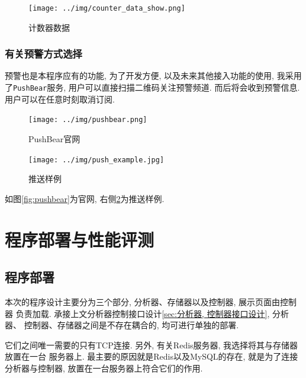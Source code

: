 \begin{figure}[htbp!]
  \centering
  \texttt{[image: ../img/counter\_data\_show.png]}
  \caption{计数器数据}
  \label{fig:counter_data_show}
\end{figure}

\subsection{有关预警方式选择}

  预警也是本程序应有的功能, 为了开发方便, 以及未来其他接入功能的使用,
我采用了\texttt{PushBear}服务, 用户可以直接扫描二维码关注预警频道.
而后将会收到预警信息. 用户可以在任意时刻取消订阅.

\begin{figure}[htbp]

\centering
\begin{minipage}{0.76\textwidth}

    \texttt{[image: ../img/pushbear.png]}
    \caption{PushBear官网}
    \label{fig:pushbear}

\end{minipage} \hfill
\begin{minipage}{0.22\textwidth}

\centering
    \texttt{[image: ../img/push\_example.jpg]}
    \caption{推送样例}
    \label{fig:push_example}
\end{minipage}

\end{figure}

如图\ref{fig:pushbear}为官网, 右侧\ref{fig:push_example}为推送样例.



\chapter{程序部署与性能评测}
\section{程序部署}

  本次的程序设计主要分为三个部分, 分析器、存储器以及控制器, 展示页面由控制器
负责加载. 承接上文分析器控制接口设计\ref{sec:分析器, 控制器接口设计}, 分析器、
控制器、存储器之间是不存在耦合的, 均可进行单独的部署.

  它们之间唯一需要的只有TCP连接. 另外, 有关Redis服务器, 我选择将其与存储器放置在一台
服务器上. 最主要的原因就是Redis以及MySQL的存在, 就是为了连接分析器与控制器,
放置在一台服务器上符合它们的作用.

